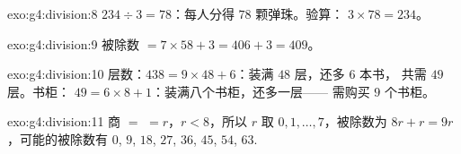 \begin{solution}{exo:g4:division:8}
$234 \div 3 = 78$：每人分得 $78$ 颗弹珠。验算：
$3 \times 78 = 234$。
\end{solution}

\begin{solution}{exo:g4:division:9}
被除数 $= 7 \times 58 + 3 = 406 + 3 = 409$。
\end{solution}

\begin{solution}{exo:g4:division:10}
层数：$438 = 9 \times 48 + 6$：装满 $48$ 层，还多 $6$ 本书，
共需 $49$ 层。书柜：
$49 = 6 \times 8 + 1$：装满八个书柜，还多一层——
需购买 $9$ 个书柜。
\end{solution}

\begin{solution}{exo:g4:division:11}
商 $=$  $= r$，$r < 8$，所以 $r$ 取 $0, 1, \dots,
7$，被除数为 $8r + r = 9r$，可能的被除数有
$0$, $9$, $18$, $27$, $36$, $45$, $54$, $63$.
\end{solution}
